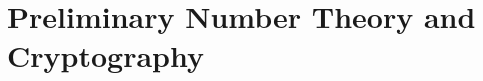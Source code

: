 \chapterspaceabove{6.75cm} 
\chapterspacebelow{7.25cm} 
\chapter{Preliminary Number Theory and Cryptography}